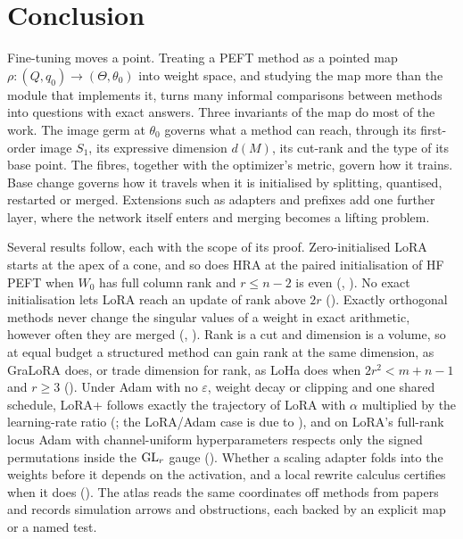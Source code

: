 \section{Conclusion}\label{sec:conclusion}

Fine-tuning moves a point. Treating a PEFT method as a pointed map $\rho:(Q,q_0)\to(\Theta,\theta_0)$ into weight space, and studying the map more than the module that implements it, turns many informal comparisons between methods into questions with exact answers. Three invariants of the map do most of the work. The image germ at $\theta_0$ governs what a method can reach, through its first-order image $S_1$, its expressive dimension $d(M)$, its cut-rank and the type of its base point. The fibres, together with the optimizer's metric, govern how it trains. Base change governs how it travels when it is initialised by splitting, quantised, restarted or merged. Extensions such as adapters and prefixes add one further layer, where the network itself enters and merging becomes a lifting problem.

Several results follow, each with the scope of its proof. Zero-initialised LoRA starts at the apex of a cone, and so does HRA at the paired initialisation of HF PEFT when $W_0$ has full column rank and $r\le n-2$ is even (, ). No exact initialisation lets LoRA reach an update of rank above $2r$ (). Exactly orthogonal methods never change the singular values of a weight in exact arithmetic, however often they are merged (, ). Rank is a cut and dimension is a volume, so at equal budget a structured method can gain rank at the same dimension, as GraLoRA does, or trade dimension for rank, as LoHa does when $2r^2<m+n-1$ and $r\ge3$ (). Under Adam with no $\varepsilon$, weight decay or clipping and one shared schedule, LoRA+ follows exactly the trajectory of LoRA with $\alpha$ multiplied by the learning-rate ratio (; the LoRA/Adam case is due to \citealp{schulman2025lora}), and on LoRA's full-rank locus Adam with channel-uniform hyperparameters respects only the signed permutations inside the $\mathrm{GL}_r$ gauge (). Whether a scaling adapter folds into the weights before it depends on the activation, and a local rewrite calculus certifies when it does (). The atlas reads the same coordinates off \nMethods{} methods from \nPapers{} papers and records \nArrows{} simulation arrows and \nObstructions{} obstructions, each backed by an explicit map or a named test.

